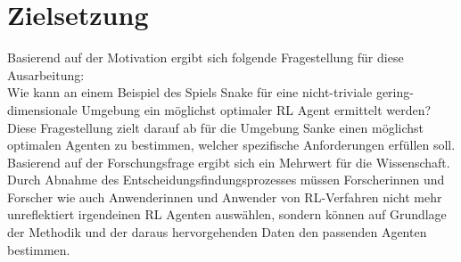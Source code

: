 \section{Zielsetzung}
Basierend auf der Motivation ergibt sich folgende Fragestellung für diese Ausarbeitung:\\
Wie kann an einem Beispiel des Spiels Snake für eine nicht-triviale gering-dimensionale Umgebung ein möglichst optimaler RL Agent ermittelt werden?\\
Diese Fragestellung zielt darauf ab für die Umgebung Sanke einen möglichst optimalen Agenten zu bestimmen, welcher spezifische Anforderungen erfüllen soll.\\
Basierend auf der Forschungsfrage ergibt sich ein Mehrwert für die Wissenschaft. Durch Abnahme des Entscheidungsfindungsprozesses müssen Forscherinnen und Forscher wie auch Anwenderinnen und Anwender von RL-Verfahren nicht mehr unreflektiert irgendeinen RL Agenten auswählen, sondern können auf Grundlage der Methodik und der daraus hervorgehenden Daten den passenden Agenten bestimmen.

